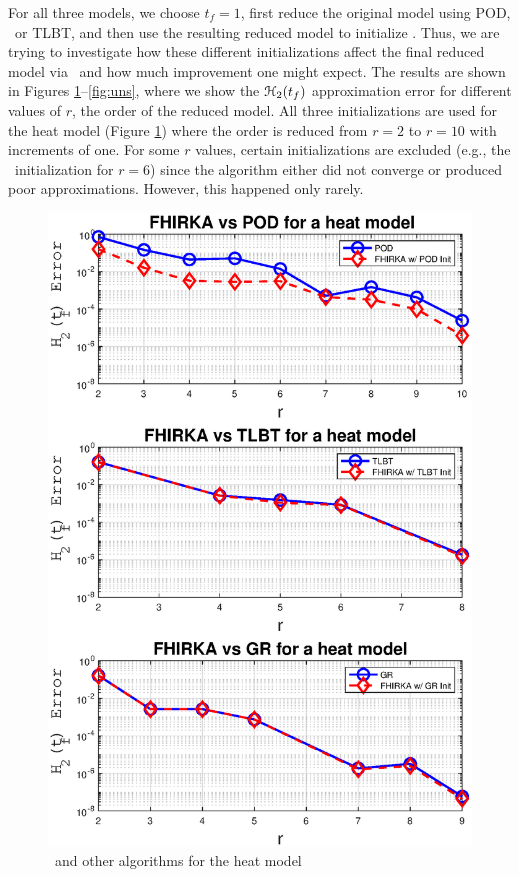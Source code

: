 \documentclass[twocolumn]{autart}
\begin{document}
For all three models, we choose $t_f = 1$, first reduce the original model using POD, \goyal \  or TLBT, and then use the resulting reduced model  to initialize \FH. Thus, we are trying to investigate how these different initializations affect the final reduced model via  \FH \ and how much improvement one might expect.
The results are shown in Figures \ref{fig:hm}--\ref{fig:uns},  where we show the $\EuScript{H}_2(t_f)$ approximation error for different values of $r$, the order of the reduced model.
  All three initializations are used for the heat model (Figure \ref{fig:hm}) where the order is reduced from $r=2$ to $r=10$ with increments of one. For some $r$ values, certain initializations are excluded (e.g., the \goyal \ initialization for $r=6$) since the algorithm either did not converge or produced  poor approximations. However, this happened only rarely.
  
   \begin{figure}[H] 
 \centering
 \includegraphics [scale=0.35]{fig1h} 
 \caption{\FH \ and other algorithms for the heat model\label{fig:hm}}
 \end{figure}
\end{document}
